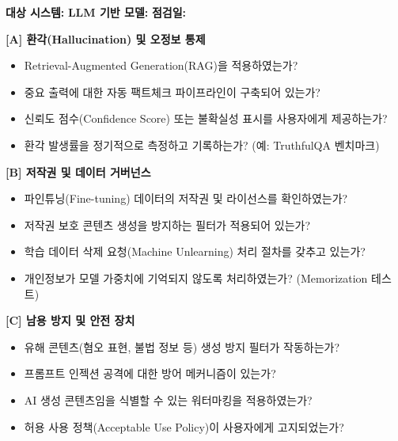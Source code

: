 \begin{tcolorbox}[colback=orange!5, colframe=orange!60, title={[Template C.7] LLM/GenAI 특화 거버넌스 체크리스트}]
\textbf{대상 시스템:} \underline{\hspace{3cm}} \quad \textbf{LLM 기반 모델:} \underline{\hspace{3cm}} \quad \textbf{점검일:} \underline{\hspace{2cm}}

\vspace{0.5em}
\textbf{[A] 환각(Hallucination) 및 오정보 통제}
\begin{itemize}
    \item[$\square$] Retrieval-Augmented Generation(RAG)을 적용하였는가?
    \item[$\square$] 중요 출력에 대한 자동 팩트체크 파이프라인이 구축되어 있는가?
    \item[$\square$] 신뢰도 점수(Confidence Score) 또는 불확실성 표시를 사용자에게 제공하는가?
    \item[$\square$] 환각 발생률을 정기적으로 측정하고 기록하는가? (예: TruthfulQA 벤치마크)
\end{itemize}

\textbf{[B] 저작권 및 데이터 거버넌스}
\begin{itemize}
    \item[$\square$] 파인튜닝(Fine-tuning) 데이터의 저작권 및 라이선스를 확인하였는가?
    \item[$\square$] 저작권 보호 콘텐츠 생성을 방지하는 필터가 적용되어 있는가?
    \item[$\square$] 학습 데이터 삭제 요청(Machine Unlearning) 처리 절차를 갖추고 있는가?
    \item[$\square$] 개인정보가 모델 가중치에 기억되지 않도록 처리하였는가? (Memorization 테스트)
\end{itemize}

\textbf{[C] 남용 방지 및 안전 장치}
\begin{itemize}
    \item[$\square$] 유해 콘텐츠(혐오 표현, 불법 정보 등) 생성 방지 필터가 작동하는가?
    \item[$\square$] 프롬프트 인젝션 공격에 대한 방어 메커니즘이 있는가?
    \item[$\square$] AI 생성 콘텐츠임을 식별할 수 있는 워터마킹을 적용하였는가?
    \item[$\square$] 허용 사용 정책(Acceptable Use Policy)이 사용자에게 고지되었는가?
\end{itemize}


\end{tcolorbox}
